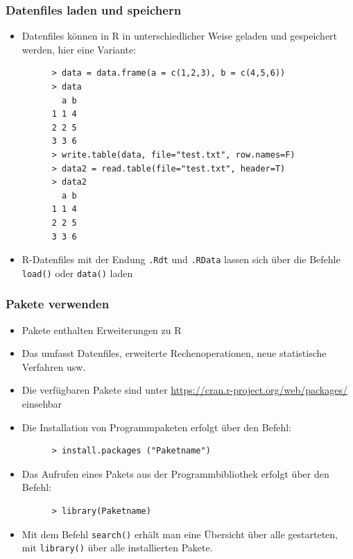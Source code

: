 \documentclass{beamer}
\begin{document}
\begin{frame}[fragile]
  \frametitle{Datenfiles laden und speichern}
  \begin{itemize}
    \item Datenfiles können in R in unterschiedlicher Weise geladen und gespeichert werden, hier eine Variante:
\begin{Verbatim}
      > data = data.frame(a = c(1,2,3), b = c(4,5,6))
      > data
        a b
      1 1 4
      2 2 5
      3 3 6
      > write.table(data, file="test.txt", row.names=F)
      > data2 = read.table(file="test.txt", header=T)
      > data2
        a b
      1 1 4
      2 2 5
      3 3 6
\end{Verbatim}
\item R-Datenfiles mit der Endung \Verb+.Rdt+ und \Verb+.RData+ lassen sich über die Befehle \Verb+load()+ oder \Verb+data()+ laden
  \end{itemize}
\end{frame}

\begin{frame}[fragile]
  \frametitle{Pakete verwenden}
  \begin{itemize}
    \item Pakete enthalten Erweiterungen zu R
    \item Das umfasst Datenfiles, erweiterte Rechenoperationen, neue statistische Verfahren usw.
    \item Die verfügbaren Pakete sind unter \url{https://cran.r-project.org/web/packages/} einsehbar
    \item Die Installation von Programmpaketen erfolgt über den Befehl:
    \begin{Verbatim}
      > install.packages ("Paketname")
    \end{Verbatim}
    \item Das Aufrufen eines Pakets aus der Programmbibliothek erfolgt über den Befehl:
    \begin{Verbatim}
      > library(Paketname)
    \end{Verbatim}  
    \item Mit dem Befehl \Verb+search()+ erhält man eine Übersicht über alle gestarteten, mit \Verb+library()+ über alle installierten Pakete.
  \end{itemize}
\end{frame}
\end{document}
